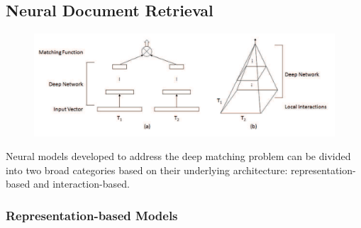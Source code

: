 
\subsection{Neural Document Retrieval}


\begin{figure}[t!]
\centering
  \includegraphics[width=6in]{deep_matching.png}
\caption{\cite{guo2017drmm}}
\label{fig:deep_matching}
\end{figure}

Neural models developed to address the deep matching problem can be divided into two broad categories based on their underlying architecture: representation-based and interaction-based.

\subsubsection{Representation-based Models}

